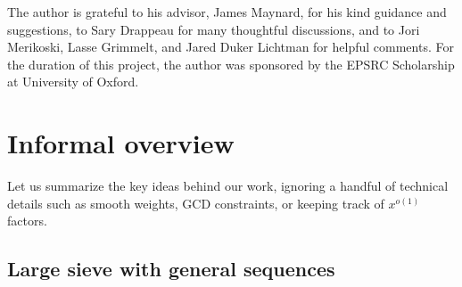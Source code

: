\documentclass[reqno,11pt]{amsart}
\theoremstyle{remark}
\numberwithin{equation}{section}
\begin{document}
The author is grateful to his advisor, James Maynard, for his kind guidance and suggestions, to Sary Drappeau for many thoughtful discussions, and to Jori Merikoski, Lasse Grimmelt, and Jared Duker Lichtman for helpful comments. For the duration of this project, the author was sponsored by the EPSRC Scholarship at University of Oxford.




\section{Informal overview} \label{sec:overview}

Let us summarize the key ideas behind our work, ignoring a handful of technical details such as smooth weights, GCD constraints, or keeping track of $x^{o(1)}$ factors.


\subsection{Large sieve with general sequences} \label{subsec:overview-general-sequences} 
\end{document}
